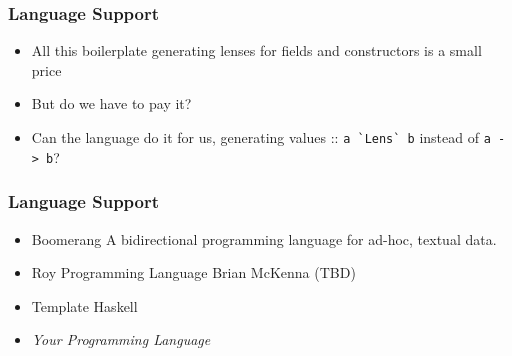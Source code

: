 \begin{frame}
\frametitle{Language Support}

\begin{itemize}
\item All this boilerplate generating lenses for fields and constructors is a small price
\item But do we have to pay it?
\item Can the language do it for us, generating values :: \lstinline$a `Lens` b$ instead of \lstinline$a -> b$?
\end{itemize}

\end{frame}

\begin{frame}
\frametitle{Language Support}

\begin{itemize}
\item Boomerang \textemdash A bidirectional programming language for ad-hoc, textual data. 
\item Roy Programming Language \textemdash Brian McKenna (TBD)
\item Template Haskell
\item \emph{Your Programming Language}
\end{itemize}

\end{frame}

